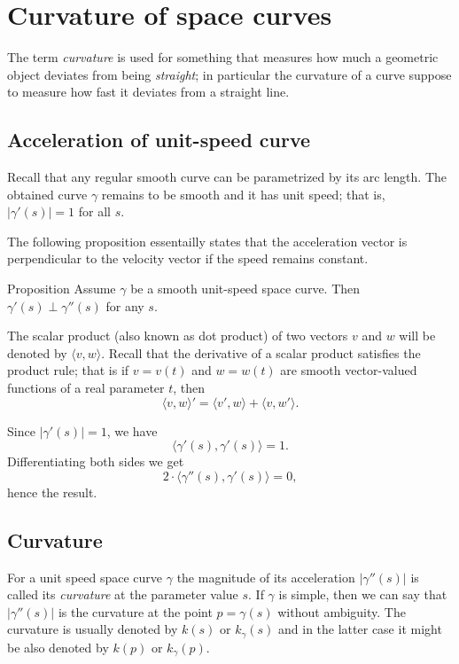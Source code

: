 \chapter{Curvature of space curves}


The term \emph{curvature} is used for something that measures how much 
a geometric object deviates from being \emph{straight};
in particular the curvature of a curve suppose to measure how fast it deviates from a straight line.

\section*{Acceleration of unit-speed curve}

Recall that any regular smooth curve can be parametrized by its arc length.
The obtained curve $\gamma$ remains to be smooth and it has unit speed; 
that is, $|\gamma'(s)|=1$ for all $s$.

The following proposition essentailly states that the acceleration vector is perpendicular to the velocity vector if the speed remains constant.

\begin{thm}{Proposition}\label{prop:a'-pertp-a''}
Assume $\gamma$ be a smooth unit-speed space curve.
Then $\gamma'(s)\perp \gamma''(s)$ for any $s$.
\end{thm}

The scalar product (also known as dot product) of two vectors $v$ and $w$ will be denoted by $\langle v,w\rangle$.
Recall that the derivative of a scalar product satisfies the product rule;
that is if $v=v(t)$ and $w=w(t)$ are smooth vector-valued functions of a real parameter $t$, then
\[\langle v,w\rangle'=\langle v',w\rangle+\langle v,w'\rangle.\]

Since $|\gamma'(s)|=1$, we have
\[\langle\gamma'(s),\gamma'(s)\rangle=1.\]
Differentiating both sides we get
\[2\cdot\langle\gamma''(s),\gamma'(s)\rangle=0,\]
hence the result.
\qeds

\section*{Curvature}

For a unit speed space curve $\gamma$ the magnitude of its acceleration $|\gamma''(s)|$ is called its \emph{curvature} at the parameter value $s$.
If $\gamma$ is simple, then we can say that $|\gamma''(s)|$ is the curvature at the point $p=\gamma(s)$ without ambiguity.
The curvature is usually denoted by $k(s)$ or $k_\gamma(s)$ and in the latter case it might be also denoted by $k(p)$ or $k_\gamma(p)$.

